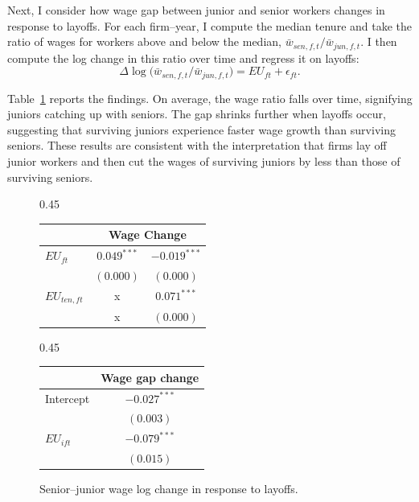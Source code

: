 Next, I consider how wage gap between junior and senior workers changes in response to layoffs. For each firm–year, I compute the median tenure and take the ratio of wages for workers above and below the median, $\bar{w}_{sen,f,t}/\bar{w}_{jun,f,t}$. I then compute the log change in this ratio over time and regress it on layoffs:
\[
\Delta \log \bigl(\bar{w}_{sen,f,t}/\bar{w}_{jun,f,t}\bigr) = EU_{ft} + \epsilon_{ft}.
\]

Table~\ref{tab:layoff_response_gap} reports the findings. On average, the wage ratio falls over time, signifying juniors catching up with seniors. The gap shrinks further when layoffs occur, suggesting that surviving juniors experience faster wage growth than surviving seniors. These results are consistent with the interpretation that firms lay off junior workers and then cut the wages of surviving juniors by less than those of surviving seniors.

\begin{figure}[t]
  \centering

  \begin{subtable}[t]{0.45\linewidth}
    \vspace{0pt}
    \centering
    \begin{tabular}{lcc}
      \toprule
      & \multicolumn{2}{c}{Wage Change}\\
      \midrule
        $EU_{ft}$    & $0.049^{***}$     &  $-0.019^{***}$  \\
                   & $(0.000)$     &  $(0.000)$      \\
        $EU_{ten,ft}$&  x    &  $0.071^{***}$  \\
                   &  x    &  $(0.000)$      \\
      \bottomrule
    \end{tabular}
    \caption{Wage change in response to tenure-specific and firm-wide layoffs.}
  \label{tab:layoff_response_wage}
  \end{subtable}
  \hfill
  \begin{subtable}[t]{0.45\linewidth}
    \vspace{0pt}
  \centering
  \begin{tabular}{lc}
      \toprule
      & \multicolumn{1}{c}{Wage gap change}\\
      \midrule
    Intercept  &  $-0.027^{***}$ \\
               &  $(0.003)$     \\
    $EU_{ift}$         &  $-0.079^{***}$ \\
               &  $(0.015)$     \\
      \bottomrule
  \end{tabular}
  \caption{Senior–junior wage log change in response to layoffs.}
  \label{tab:layoff_response_gap}
  \end{subtable}
\end{figure}


